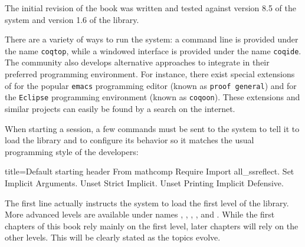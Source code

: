 The initial revision of the book was written and tested against
version 8.5 of the \Coq{} system and version 1.6 of the \mcbMC{} library.

There are a variety of ways to run the \Coq{} system: a command line is
provided under the name \texttt{coqtop}, while a windowed interface is
provided under the name \texttt{coqide}.  The \Coq{} community also develops
alternative approaches to integrate \Coq{} in their preferred programming
environment.  For instance, there exist special extensions of \Coq{} for the
popular \texttt{emacs} programming editor (known as \texttt{proof general})
and for the \texttt{Eclipse} programming environment
(known as \texttt{coqoon}).  These extensions and similar projects can easily
be found by a search on the internet.

When starting a \Coq{} session, a few commands must be sent to the \Coq{}
system to tell it to load the \mcbMC{} library and to configure its behavior
so it matches the usual programming style of the \mcbMC{} developers:

\begin{coq}{}{title={Default starting header}}
From mathcomp Require Import all_ssreflect.
Set Implicit Arguments.
Unset Strict Implicit.
Unset Printing Implicit Defensive.
\end{coq}
The first line actually instructs the \Coq{} system to load the first level
of the \mcbMC{} library.  More advanced levels are available under names
, , , ,
and .  While the first chapters of this book
rely mainly on the first
level, later chapters will rely on the other levels.  This will be clearly
stated as the topics evolve.

